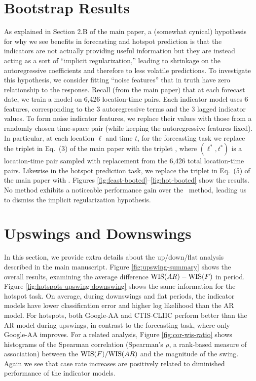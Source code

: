 \section{Bootstrap Results}

As explained in Section 2.B of the main paper, a (somewhat cynical) hypothesis
for why we see benefits in forecasting and hotspot prediction is that the
indicators are not actually providing useful information but they are instead
acting as a sort of ``implicit regularization,'' leading to shrinkage on the
autoregressive coefficients and therefore to less volatile predictions.  To
investigate this hypothesis, we consider fitting ``noise features'' that in
truth have zero relationship to the response.  Recall (from the main paper) that
at each forecast date, we train a model on 6,426 location-time pairs.  Each
indicator model uses 6 features, corresponding to the 3 autoregressive terms and
the 3 lagged indicator values.  To form noise indicator features, we replace
their values with those from a randomly chosen time-space pair (while keeping
the autoregressive features fixed).  In particular, at each location $\ell$ and
time $t$, for the forecasting task we replace the triplet  in Eq.\ (3) of the main
paper with the triplet , where $(\ell^*,t^*)$ is a location-time pair sampled with
replacement from the 6,426 total location-time pairs.  Likewise in the hotspot 
prediction task, we replace the triplet  in Eq.\ (5) of the main paper with
.  Figures
\ref{fig:fcast-booted}--\ref{fig:hot-booted} show the results.  No method
exhibits a noticeable performance gain over the \ar~method, leading us to
dismiss the implicit regularization hypothesis. 

\section{Upswings and Downswings}

In this section, we provide extra details about the up/down/flat analysis
described in the main manuscript. Figure \ref{fig:upswing-summary} shows the
overall results, examining the average difference $\mathrm{WIS}(AR) - \mathrm{WIS}(F)$ in
period. Figure \ref{fig:hotspots-upswing-downswing} shows the same information
for the hotspot task. On average, during downswings and flat periods, the
indicator models have lower classification error and higher log likelihood than
the AR model. For hotspots, both Google-AA and CTIS-CLIIC perform better than
the AR model during upswings, in contrast to the forecasting task, where only
Google-AA improves. For a related analysis, Figure \ref{fig:cor-wis-ratio} shows
histograms of the Spearman correlation (Spearman's $\rho$, a rank-based measure
of association) between the $\mathrm{WIS}(F)/\mathrm{WIS}(AR)$ and the magnitude of the
swing. Again we see that case rate increases are positively related to
diminished performance of the indicator models.

